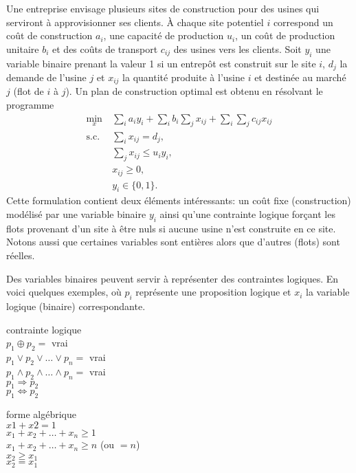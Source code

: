 \begin{example}[Localisation]
Une entreprise envisage plusieurs sites de construction pour des usines qui serviront à approvisionner ses clients.
\`A chaque site potentiel $i$ correspond un coût de construction $a_i$, une capacité de production $u_i$, un coût de production unitaire $b_i$ et des coûts de transport $c_{ij}$ des usines vers les clients.
Soit $y_i$ une variable binaire prenant la valeur 1 si un entrepôt est construit sur le site $i$, $d_j$ la demande de l'usine $j$ et $x_{ij}$ la quantité produite à l'usine $i$ et destinée au marché $j$ (flot de $i$ à $j$).
Un plan de construction optimal est obtenu en résolvant le programme
\begin{align*}
\min_x\ & \sum_i a_iy_i + \sum_i b_i \sum_j x_{ij} + \sum_i \sum_j c_{ij}x_{ij} \\
\text{s.c. } & \sum_i x_{ij} = d_j, \\
& \sum_j x_{ij} \leq u_iy_i, \\
& x_{ij} \geq 0, \\
& y_i \in \lbrace 0, 1 \rbrace.
\end{align*}
Cette formulation contient deux éléments intéressants: un coût fixe (construction) modélisé par une variable binaire $y_i$ ainsi qu'une contrainte logique forçant les flots provenant d'un site à être nuls si aucune usine n'est construite en ce site.
Notons aussi que certaines variables sont entières alors que d'autres (flots) sont
réelles.
\end{example}

\begin{example}
Des variables binaires peuvent servir à représenter des contraintes logiques.
En voici quelques exemples, où $p_i$ représente une proposition logique et $x_i$ la variable logique (binaire) correspondante.
\begin{center}
\begin{minipage}{0.4\textwidth}
contrainte logique\\
$p_1 \oplus p_2 =$ vrai \\
$p_1 \lor p_2 \lor \dots \lor p_n =$ vrai \\
$p_1 \land p_2 \land \ldots \land p_n =$ vrai \\
$p_1 \Rightarrow p_2$ \\
$p_1 \Leftrightarrow p_2$
\end{minipage}
\begin{minipage}{0.4\textwidth}
 forme algébrique \\
$x1 + x2 = 1$ \\
$x_1 + x_2 + \ldots + x_n \geq 1$ \\
$x_1 + x_2 + \ldots + x_n \geq n$ (ou $= n$) \\
$x_2 \geq x_1$ \\
$x_2 = x_1$
\end{minipage}
\end{center}
\end{example}

